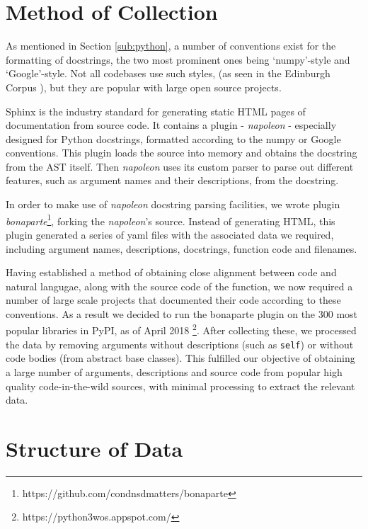 \section{Method of Collection} %
\label{sec:method_of_collection}

As mentioned in Section \ref{sub:python}, a number of conventions exist for the formatting of docstrings, the two most prominent ones being `numpy'-style and `Google'-style.
Not all codebases use such styles, (as seen in the Edinburgh Corpus \cite{barone_parallel_2017}), but they are popular with large open source projects. 

Sphinx is the industry standard for generating static HTML pages of documentation from source code. It contains a plugin - \textit{napoleon} - especially designed for Python docstrings, formatted according to the numpy or Google conventions. 
This plugin loads the source into memory and obtains the docstring from the AST itself.
Then \textit{napoleon} uses its custom parser to parse out different features, such as argument names and their descriptions, from the docstring.

In order to make use of \textit{napoleon} docstring parsing facilities, we wrote plugin \textit{bonaparte}\footnote{https://github.com/condnsdmatters/bonaparte}, forking the \textit{napoleon}'s source. 
Instead of generating HTML, this plugin generated a series of yaml files with the associated data we required, including argument names, descriptions, docstrings, function code and filenames.
 
Having established a method of obtaining close alignment between code and natural langugae, along with the source code of the function, we now required a number of large scale projects that documented their code according to these conventions. 
As a result we decided to run the bonaparte plugin on the 300 most popular libraries in PyPI, as of April 2018 \footnote{https://python3wos.appspot.com/}.
After collecting these, we processed the data by removing arguments without descriptions (such as \texttt{self}) or without code bodies (from abstract base classes).
This fulfilled our objective of obtaining a large number of arguments, descriptions and source code from popular high quality code-in-the-wild sources, with minimal processing to extract the relevant data.

\section{Structure of Data}


